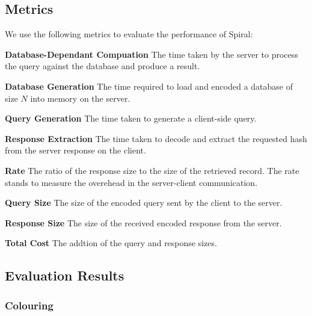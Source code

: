 \subsection{Metrics}

We use the following metrics to evaluate the performance of Spiral:

\itemize
\item \textbf{Database-Dependant Compuation} The time taken by the server to
process the query against the database and produce a result.
\item \textbf{Database Generation} The time required to load and encoded a database of
size $N$ into memory on the server.
\item \textbf{Query Generation} The time taken to generate a client-side query.
\item \textbf{Response Extraction} The time taken to decode and extract the requested hash
from the server response on the client.
\item \textbf{Rate} The ratio of the response size to the size of the retrieved record.
The rate stands to measure the overehead in the server-client communication.
\item \textbf{Query Size} The size of the encoded query sent by the client to the server.
\item \textbf{Response Size} The size of the received encoded response from the server.
\item \textbf{Total Cost} The addtion of the query and response sizes.

\subsection{Evaluation Results}

\subsubsection{Colouring}


\newpage

\newpage

\newpage

\newpage

\newpage

\newpage

\newpage



